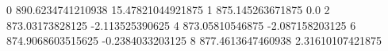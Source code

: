 0 890.6234741210938 15.47821044921875
1 875.145263671875 0.0
2 873.03173828125 -2.113525390625
4 873.05810546875 -2.087158203125
6 874.9068603515625 -0.2384033203125
8 877.4613647460938 2.31610107421875
